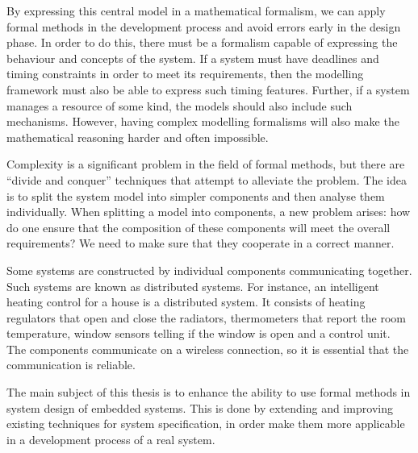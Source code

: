 By expressing this central model in a mathematical formalism, we can apply formal methods in the development process and avoid errors early in the design phase. In order to do this, there must be a formalism capable of expressing the behaviour and concepts of the system. If a system must have deadlines and timing constraints in order to meet its requirements, then the modelling framework must also be able to express such timing features. Further, if a system manages a resource of some kind, the models should also include such mechanisms. However, having complex modelling formalisms will also make the mathematical reasoning harder and often impossible.

Complexity is a significant problem in the field of formal methods, but there are ``divide and conquer'' techniques that attempt to alleviate the problem. The idea is to split the system model into simpler components and then analyse them individually. When splitting a model into components, a new problem arises: how do one ensure that the composition of these components will meet the overall requirements? We need to make sure that they cooperate in a correct manner.

Some systems are constructed by individual components communicating together. Such systems are known as distributed systems. For instance, an intelligent heating control for a house is a distributed system. It consists of heating regulators that open and close the radiators, thermometers that report the room temperature, window sensors telling if the window is open and a control unit. The components communicate on a wireless connection, so it is essential that the communication is reliable.

The main subject of this thesis is to enhance the ability to use formal methods in system design of embedded systems. This is done by extending and improving existing techniques for system specification, in order make them more applicable in a development process of a real system. 








